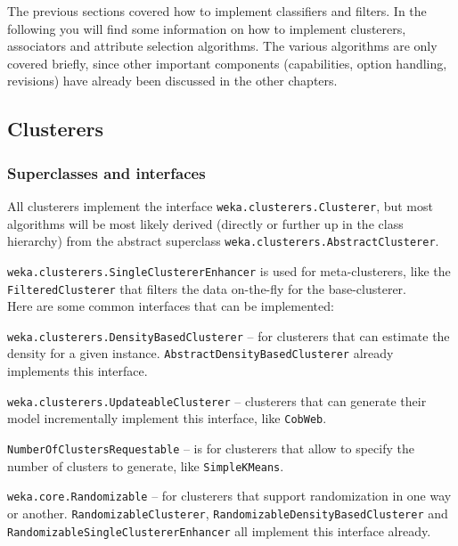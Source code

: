 %
%
%
%


The previous sections covered how to implement classifiers and filters. In the
following you will find some information on how to implement clusterers,
associators and attribute selection algorithms. The various algorithms are only
covered briefly, since other important components (capabilities, option
handling, revisions) have already been discussed in the other chapters.


\subsection{Clusterers}
\subsubsection*{Superclasses and interfaces}
All clusterers implement the interface \texttt{weka.clusterers.Clusterer},
but most algorithms will be most likely derived (directly or further up in the
class hierarchy) from the abstract superclass
\texttt{weka.clusterers.AbstractClusterer}.

\texttt{weka.clusterers.SingleClustererEnhancer} is used for meta-clusterers,
like the \texttt{FilteredClusterer} that filters the data on-the-fly for the
base-clusterer. \\

\noindent Here are some common interfaces that can be implemented:
\begin{tight_itemize}
  \item \texttt{weka.clusterers.DensityBasedClusterer} -- for clusterers that
can estimate the density for a given instance.
\texttt{AbstractDensityBasedClusterer} already implements this interface.
  \item \texttt{weka.clusterers.UpdateableClusterer} -- clusterers that can
generate their model incrementally implement this interface, like
\texttt{CobWeb}.
  \item \texttt{NumberOfClustersRequestable} -- is for clusterers that allow to
specify the number of clusters to generate, like \texttt{SimpleKMeans}.
  \item \texttt{weka.core.Randomizable} -- for clusterers that support
randomization in one way or another. \texttt{RandomizableClusterer},
\texttt{RandomizableDensityBasedClusterer} and
\texttt{RandomizableSingleClustererEnhancer} all implement this interface
already.
\end{tight_itemize}

